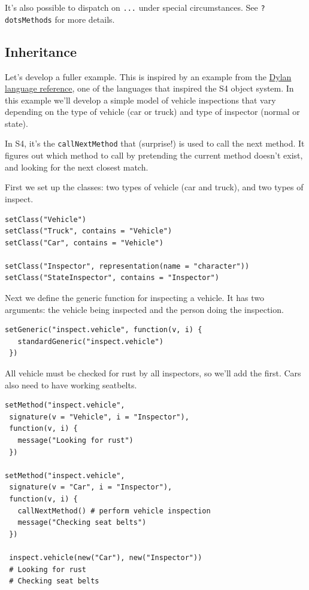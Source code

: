 It's also possible to dispatch on \texttt{...} under special
circumstances. See \texttt{?dotsMethods} for more details.

\subsection{Inheritance}

Let's develop a fuller example. This is inspired by an example from the
\href{http://www.opendylan.org/gdref/tutorial.html}{Dylan language
reference}, one of the languages that inspired the S4 object system. In
this example we'll develop a simple model of vehicle inspections that
vary depending on the type of vehicle (car or truck) and type of
inspector (normal or state).

In S4, it's the \texttt{callNextMethod} that (surprise!) is used to call
the next method. It figures out which method to call by pretending the
current method doesn't exist, and looking for the next closest match.

First we set up the classes: two types of vehicle (car and truck), and
two types of inspect.

\begin{verbatim}
setClass("Vehicle")
setClass("Truck", contains = "Vehicle")
setClass("Car", contains = "Vehicle")

setClass("Inspector", representation(name = "character"))
setClass("StateInspector", contains = "Inspector")
\end{verbatim}

Next we define the generic function for inspecting a vehicle. It has two
arguments: the vehicle being inspected and the person doing the
inspection.

\begin{verbatim}
setGeneric("inspect.vehicle", function(v, i) {
   standardGeneric("inspect.vehicle")
 })
\end{verbatim}

All vehicle must be checked for rust by all inspectors, so we'll add the
first. Cars also need to have working seatbelts.

\begin{verbatim}
setMethod("inspect.vehicle", 
 signature(v = "Vehicle", i = "Inspector"), 
 function(v, i) {
   message("Looking for rust")
 })

setMethod("inspect.vehicle", 
 signature(v = "Car", i = "Inspector"),
 function(v, i) {  
   callNextMethod() # perform vehicle inspection
   message("Checking seat belts")
 })

 inspect.vehicle(new("Car"), new("Inspector"))
 # Looking for rust
 # Checking seat belts
\end{verbatim}

